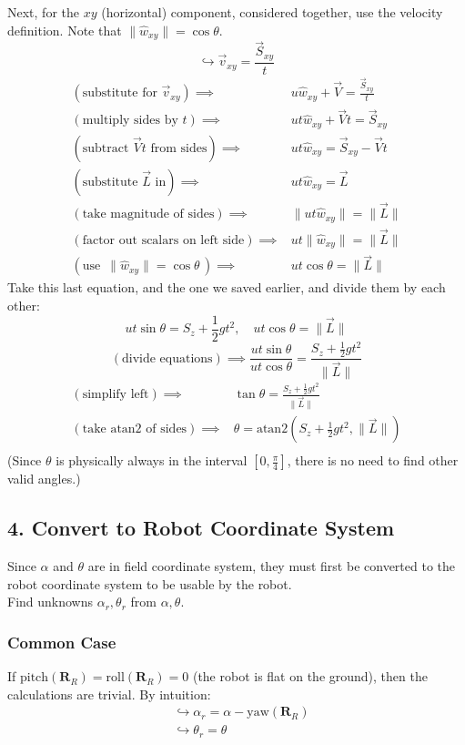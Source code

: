 \documentclass{article}
\begin{document}
Next, for the $xy$ (horizontal) component, considered together, use the velocity definition. Note that $\lVert\hat{w}_{xy}\rVert=\cos\theta$.
\[ \hookrightarrow\vec{v}_{xy}=\frac{\vec{S}_{xy}}{t} \]
\begin{align*}
    (\text{substitute for }\vec{v}_{xy})\implies&u\hat{w}_{xy}+\vec{V}=\frac{\vec{S}_{xy}}{t} \\
    (\text{multiply sides by }t)\implies&ut\hat{w}_{xy}+\vec{V}t=\vec{S}_{xy} \\
    (\text{subtract }\vec{V}t\text{ from sides})\implies&ut\hat{w}_{xy}=\vec{S}_{xy}-\vec{V}t \\
    (\text{substitute }\vec{L}\text{ in})\implies&ut\hat{w}_{xy}=\vec{L} \\
    (\text{take magnitude of sides})\implies&\lVert ut\hat{w}_{xy}\rVert=\lVert\vec{L}\rVert \\
    (\text{factor out scalars on left side})\implies&ut\lVert\hat{w}_{xy}\rVert=\lVert\vec{L}\rVert \\
    (\text{use }\,\lVert\hat{w}_{xy}\rVert=\cos\theta\,) \implies&ut\cos\theta=\lVert\vec{L}\rVert
\end{align*}
Take this last equation, and the one we saved earlier, and divide them by each other:
\[ ut\sin\theta=S_z+\frac{1}{2}gt^2,\quad ut\cos\theta=\lVert\vec{L}\rVert \]
\[ (\text{divide equations})\implies\frac{ut\sin\theta}{ut\cos\theta}=\frac{S_z+\frac{1}{2}gt^2}{\lVert\vec{L}\rVert} \]
\begin{align*}
    (\text{simplify left})\implies&\tan\theta=\frac{S_z+\frac{1}{2}gt^2}{\lVert\vec{L}\rVert} \\
    (\text{take atan2 of sides})\implies&\boxed{\theta=\text{atan2}(S_z+\frac{1}{2}gt^2,\lVert\vec{L}\rVert)} \\
\end{align*}
(Since $\theta$ is physically always in the interval $[0,\frac{\pi}{4}]$, there is no need to find other valid angles.)

\subsection*{4. Convert to Robot Coordinate System}
Since $\alpha$ and $\theta$ are in field coordinate system, they must first be converted to the robot coordinate system to be usable by the robot. \\
Find unknowns $\alpha_r,\theta_r$ from $\alpha,\theta$.

\subsubsection*{Common Case}
If $\text{pitch}(\boldsymbol{R}_R)=\text{roll}(\boldsymbol{R}_R)=0$ (the robot is flat on the ground), then the calculations are trivial. By intuition:
\begin{align*}
    &\hookrightarrow\boxed{\alpha_r=\alpha-\text{yaw}(\boldsymbol{R}_R)} \\
    &\hookrightarrow\boxed{\theta_r=\theta} \\
\end{align*}
\end{document}
